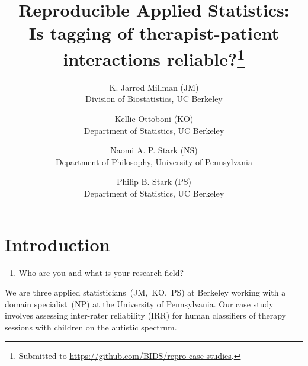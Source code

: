 \documentclass[]{article}
\date{}
\begin{document}
\title{Reproducible Applied Statistics:\\
Is tagging of therapist-patient interactions reliable?\thanks{Submitted
to \url{https://github.com/BIDS/repro-case-studies}.
}}

\author{K. Jarrod Millman (JM)\\ Division of Biostatistics, UC Berkeley \and
Kellie Ottoboni (KO)\\ Department of Statistics, UC Berkeley \and
Naomi A. P. Stark (NS)\\ Department of Philosophy, University of Pennsylvania \and
Philip B. Stark (PS)\\ Department of Statistics, UC Berkeley
}


\maketitle


\section{Introduction}

\begin{enumerate}
\def\labelenumi{\arabic{enumi})}
\itemsep1pt\parskip0pt
\item
  Who are you and what is your research field?
\end{enumerate}


We are three applied statisticians~(JM,~KO,~PS) at Berkeley working with a
domain specialist~(NP) at the University of Pennsylvania. Our case study
involves assessing inter-rater reliability (IRR) for human classifiers of
therapy sessions with children on the autistic spectrum.
\end{document}
